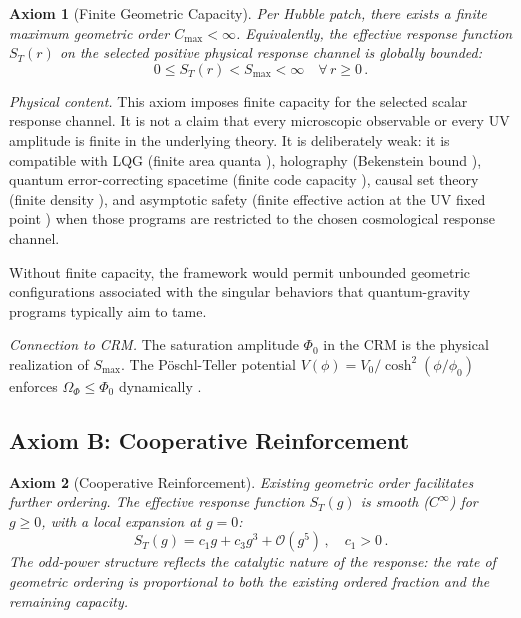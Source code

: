 \documentclass[aps,prd,twocolumn,superscriptaddress,nofootinbib]{revtex4-2}
\newtheorem{axiom}{Axiom}
\begin{document}
\begin{axiom}[Finite Geometric Capacity]
\label{ax:capacity}
Per Hubble patch, there exists a finite maximum geometric order $C_{\max} < \infty$. Equivalently, the effective response function $S_T(r)$ on the selected positive physical response channel is globally bounded:
\begin{equation}
0 \leq S_T(r) < S_{\max} < \infty \quad \forall\, r \geq 0\,.
\end{equation}
\end{axiom}

\textit{Physical content.} This axiom imposes finite capacity for the selected scalar response channel. It is not a claim that every microscopic observable or every UV amplitude is finite in the underlying theory. It is deliberately weak: it is compatible with LQG (finite area quanta \cite{Rovelli2004}), holography (Bekenstein bound \cite{Bekenstein1981}), quantum error-correcting spacetime (finite code capacity \cite{Almheiri2015}), causal set theory (finite density \cite{Sorkin2003}), and asymptotic safety (finite effective action at the UV fixed point \cite{Reuter1998}) when those programs are restricted to the chosen cosmological response channel.

Without finite capacity, the framework would permit unbounded geometric configurations associated with the singular behaviors that quantum-gravity programs typically aim to tame.

\textit{Connection to CRM.} The saturation amplitude $\Phi_0$ in the CRM \cite{Geiger2026} is the physical realization of $S_{\max}$. The P\"oschl-Teller potential $V(\phi) = V_0/\cosh^2(\phi/\phi_0)$ enforces $\Omega_\Phi \leq \Phi_0$ dynamically \cite{Geiger2026c}.

\subsection{Axiom B: Cooperative Reinforcement}

\begin{axiom}[Cooperative Reinforcement]
\label{ax:cooperative}
Existing geometric order facilitates further ordering. The effective response function $S_T(g)$ is smooth ($C^\infty$) for $g \geq 0$, with a local expansion at $g = 0$:
\begin{equation}
S_T(g) = c_1 g + c_3 g^3 + \mathcal{O}(g^5)\,, \quad c_1 > 0\,.
\label{eq:ir_expansion}
\end{equation}
The odd-power structure reflects the catalytic nature of the response: the rate of geometric ordering is proportional to both the existing ordered fraction and the remaining capacity.
\end{axiom}
\end{document}
